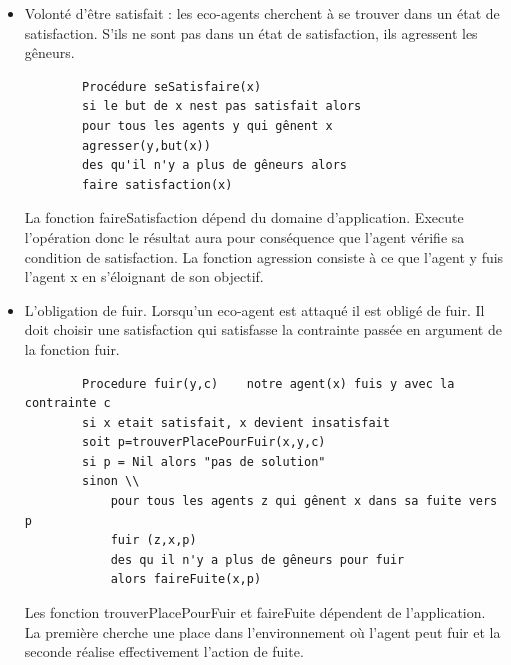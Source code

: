         \begin{itemize}
        \item  Volonté d'être satisfait : les eco-agents cherchent à se trouver dans un état de satisfaction. S'ils ne sont pas dans un état de satisfaction, ils agressent les gêneurs. \\
        \begin{verbatim}
        Procédure seSatisfaire(x) 
        si le but de x nest pas satisfait alors 
        pour tous les agents y qui gênent x 
        agresser(y,but(x))
        des qu'il n'y a plus de gêneurs alors 
        faire satisfaction(x)
        \end{verbatim}
        La fonction faireSatisfaction dépend du domaine d'application. Execute l'opération donc le résultat aura pour conséquence que l'agent vérifie sa condition de satisfaction. La fonction agression consiste à ce que l'agent y fuis l'agent x en s'éloignant de son objectif.  
        \item L'obligation de fuir. Lorsqu'un eco-agent est attaqué il est obligé de fuir. Il doit choisir une satisfaction qui satisfasse la contrainte passée en argument de la fonction fuir. \\
       \begin{verbatim}
        Procedure fuir(y,c)    notre agent(x) fuis y avec la contrainte c
        si x etait satisfait, x devient insatisfait 
        soit p=trouverPlacePourFuir(x,y,c) 
        si p = Nil alors "pas de solution"
        sinon \\
            pour tous les agents z qui gênent x dans sa fuite vers p 
            fuir (z,x,p) 
            des qu il n'y a plus de gêneurs pour fuir
            alors faireFuite(x,p) 
        \end{verbatim}    
        Les fonction trouverPlacePourFuir et faireFuite dépendent de l'application. La première cherche une place dans l'environnement où l'agent peut fuir et la seconde réalise effectivement l'action de fuite.     
        \end{itemize}
    
    
    
